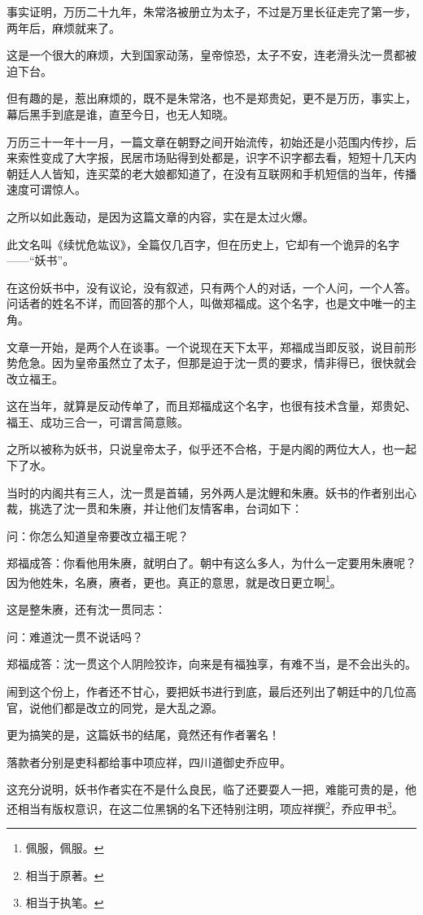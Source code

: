 \begin{multicols}{\theparacolNo}
事实证明，万历二十九年，朱常洛被册立为太子，不过是万里长征走完了第一步，两年后，麻烦就来了。

这是一个很大的麻烦，大到国家动荡，皇帝惊恐，太子不安，连老滑头沈一贯都被迫下台。

但有趣的是，惹出麻烦的，既不是朱常洛，也不是郑贵妃，更不是万历，事实上，幕后黑手到底是谁，直至今日，也无人知晓。

万历三十一年十一月，一篇文章在朝野之间开始流传，初始还是小范围内传抄，后来索性变成了大字报，民居市场贴得到处都是，识字不识字都去看，短短十几天内朝廷人人皆知，连买菜的老大娘都知道了，在没有互联网和手机短信的当年，传播速度可谓惊人。

之所以如此轰动，是因为这篇文章的内容，实在是太过火爆。

此文名叫《续忧危竑议》，全篇仅几百字，但在历史上，它却有一个诡异的名字——“妖书”。

在这份妖书中，没有议论，没有叙述，只有两个人的对话，一个人问，一个人答。问话者的姓名不详，而回答的那个人，叫做郑福成。这个名字，也是文中唯一的主角。

文章一开始，是两个人在谈事。一个说现在天下太平，郑福成当即反驳，说目前形势危急。因为皇帝虽然立了太子，但那是迫于沈一贯的要求，情非得已，很快就会改立福王。

这在当年，就算是反动传单了，而且郑福成这个名字，也很有技术含量，郑贵妃、福王、成功三合一，可谓言简意赅。

之所以被称为妖书，只说皇帝太子，似乎还不合格，于是内阁的两位大人，也一起下了水。

当时的内阁共有三人，沈一贯是首辅，另外两人是沈鲤和朱赓。妖书的作者别出心裁，挑选了沈一贯和朱赓，并让他们友情客串，台词如下：

问：你怎么知道皇帝要改立福王呢？

郑福成答：你看他用朱赓，就明白了。朝中有这么多人，为什么一定要用朱赓呢？因为他姓朱，名赓，赓者，更也。真正的意思，就是改日更立啊\footnote{佩服，佩服。}。

这是整朱赓，还有沈一贯同志：

问：难道沈一贯不说话吗？

郑福成答：沈一贯这个人阴险狡诈，向来是有福独享，有难不当，是不会出头的。

闹到这个份上，作者还不甘心，要把妖书进行到底，最后还列出了朝廷中的几位高官，说他们都是改立的同党，是大乱之源。

更为搞笑的是，这篇妖书的结尾，竟然还有作者署名！

落款者分别是吏科都给事中项应祥，四川道御史乔应甲。

这充分说明，妖书作者实在不是什么良民，临了还要耍人一把，难能可贵的是，他还相当有版权意识，在这二位黑锅的名下还特别注明，项应祥撰\footnote{相当于原著。}，乔应甲书\footnote{相当于执笔。}。


\end{multicols}
